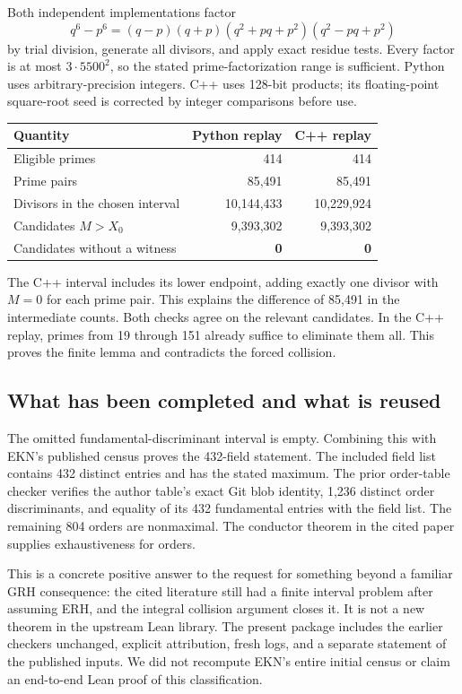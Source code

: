Both independent implementations factor
\[
 q^6-p^6=(q-p)(q+p)(q^2+pq+p^2)(q^2-pq+p^2)
\]
by trial division, generate all divisors, and apply exact residue tests. Every factor is at most $3\cdot5500^2$, so the stated prime-factorization range is sufficient. Python uses arbitrary-precision integers. C++ uses 128-bit products; its floating-point square-root seed is corrected by integer comparisons before use.

\begin{center}
\begin{tabular}{@{}lrr@{}}
\toprule
Quantity & Python replay & C++ replay\\
\midrule
Eligible primes &414&414\\
Prime pairs &85,491&85,491\\
Divisors in the chosen interval &10,144,433&10,229,924\\
Candidates $M>X_0$ &9,393,302&9,393,302\\
Candidates without a witness &\textbf{0}&\textbf{0}\\
\bottomrule
\end{tabular}
\end{center}

The C++ interval includes its lower endpoint, adding exactly one divisor with $M=0$ for each prime pair. This explains the difference of 85,491 in the intermediate counts. Both checks agree on the relevant candidates. In the C++ replay, primes from 19 through 151 already suffice to eliminate them all. This proves the finite lemma and contradicts the forced collision.

\subsection{What has been completed and what is reused}

The omitted fundamental-discriminant interval is empty. Combining this with EKN's published census proves the 432-field statement. The included field list contains 432 distinct entries and has the stated maximum. The prior order-table checker verifies the author table's exact Git blob identity, 1,236 distinct order discriminants, and equality of its 432 fundamental entries with the field list. The remaining 804 orders are nonmaximal. The conductor theorem in the cited paper supplies exhaustiveness for orders.\cite{ARSX,orderData}

This is a concrete positive answer to the request for something beyond a familiar GRH consequence: the cited literature still had a finite interval problem after assuming ERH, and the integral collision argument closes it. It is not a new theorem in the upstream Lean library. The present package includes the earlier checkers unchanged, explicit attribution, fresh logs, and a separate statement of the published inputs. We did not recompute EKN's entire initial census or claim an end-to-end Lean proof of this classification.
